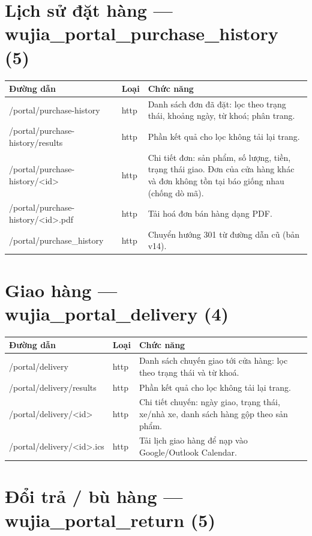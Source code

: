 \documentclass[11pt,a4paper]{report}
\newcommand{\rt}[1]{{\ttfamily\footnotesize #1}}
\begin{document}
\section{Lịch sử đặt hàng --- \rt{wujia\_portal\_purchase\_history} (5)}

{\small
\begin{longtable}{@{}L{5.4cm}L{1.5cm}L{7.5cm}@{}}
\toprule
\textbf{Đường dẫn} & \textbf{Loại} & \textbf{Chức năng} \\
\midrule
\endhead
\rt{/portal/purchase-history} & http & Danh sách đơn đã đặt: lọc theo trạng thái, khoảng ngày, từ khoá; phân trang. \\
\rt{/portal/purchase-history/results} & http & Phần kết quả cho lọc không tải lại trang. \\
\rt{/portal/purchase-history/<id>} & http & Chi tiết đơn: sản phẩm, số lượng, tiền, trạng thái giao. Đơn của cửa hàng khác và đơn không tồn tại báo giống nhau (chống dò mã). \\
\rt{/portal/purchase-history/<id>.pdf} & http & Tải hoá đơn bán hàng dạng PDF. \\
\rt{/portal/purchase\_history} & http & Chuyển hướng 301 từ đường dẫn cũ (bản v14). \\
\bottomrule
\end{longtable}}

\section{Giao hàng --- \rt{wujia\_portal\_delivery} (4)}

{\small
\begin{longtable}{@{}L{5.4cm}L{1.5cm}L{7.5cm}@{}}
\toprule
\textbf{Đường dẫn} & \textbf{Loại} & \textbf{Chức năng} \\
\midrule
\endhead
\rt{/portal/delivery} & http & Danh sách chuyến giao tới cửa hàng: lọc theo trạng thái và từ khoá. \\
\rt{/portal/delivery/results} & http & Phần kết quả cho lọc không tải lại trang. \\
\rt{/portal/delivery/<id>} & http & Chi tiết chuyến: ngày giao, trạng thái, xe/nhà xe, danh sách hàng gộp theo sản phẩm. \\
\rt{/portal/delivery/<id>.ics} & http & Tải lịch giao hàng để nạp vào Google/Outlook Calendar. \\
\bottomrule
\end{longtable}}

\section{Đổi trả / bù hàng --- \rt{wujia\_portal\_return} (5)}
\end{document}
